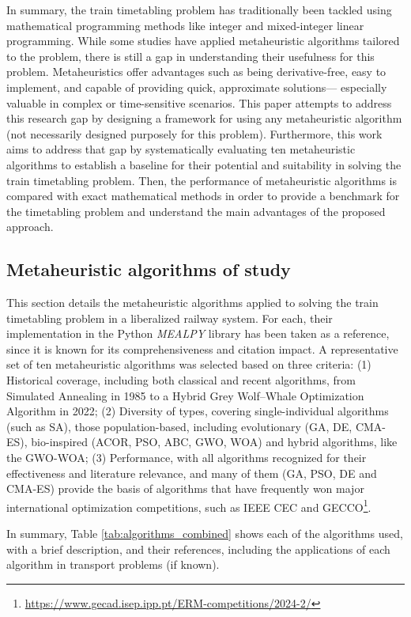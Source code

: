 \documentclass[Afour,sagev,times]{sagej}
\begin{document}
In summary, the train timetabling problem has traditionally been tackled using mathematical programming methods like integer and mixed-integer linear programming. While some studies have applied metaheuristic algorithms tailored to the problem, there is still a gap in understanding their usefulness for this problem. Metaheuristics offer advantages such as being derivative-free, easy to implement, and capable of providing quick, approximate solutions— especially valuable in complex or time-sensitive scenarios. 
This paper attempts to address this research gap by designing a framework for using any metaheuristic algorithm (not necessarily designed purposely for this problem). Furthermore, this work aims to address that gap by systematically evaluating ten metaheuristic algorithms to establish a baseline for their potential and suitability in solving the train timetabling problem. Then, the performance of metaheuristic algorithms is compared with exact mathematical methods in order to provide a benchmark for the timetabling problem and understand the main advantages of the proposed approach.

\subsection{Metaheuristic algorithms of study}

This section details the metaheuristic algorithms applied to solving the train timetabling problem in a liberalized railway system. For each, their implementation in the Python \textit{MEALPY} library has been taken as a reference, since it is known for its comprehensiveness and citation impact. A representative set of ten metaheuristic algorithms was selected based on three criteria: (1) Historical coverage, including both classical and recent algorithms, from Simulated Annealing in 1985 to a Hybrid Grey Wolf–Whale Optimization Algorithm in 2022; (2) Diversity of types, covering single-individual algorithms (such as SA), those population-based, including evolutionary (GA, DE, CMA-ES), bio-inspired (ACOR, PSO, ABC, GWO, WOA) and hybrid algorithms, like the GWO-WOA; (3) Performance, with all algorithms recognized for their effectiveness and literature relevance, and many of them (GA, PSO, DE and CMA-ES) provide the basis of algorithms that have frequently won major international optimization competitions, such as IEEE CEC \cite{Qiao24} and GECCO\footnote{\url{https://www.gecad.isep.ipp.pt/ERM-competitions/2024-2/}}.


In summary, Table \ref{tab:algorithms_combined} shows each of the algorithms used, with a brief description, and their references, including the applications of each algorithm in transport problems (if known).
\end{document}
